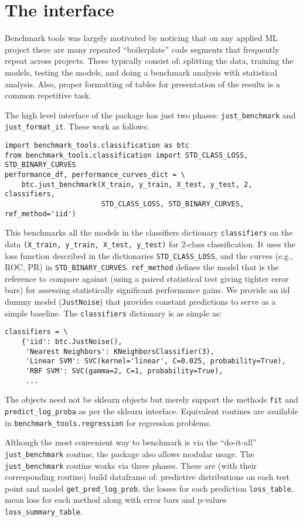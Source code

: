\documentclass{article}
\newcommand{\code}{\texttt}
\begin{document}
\section{The interface}

Benchmark tools was largely motivated by noticing that on any applied ML project there are many repeated ``boilerplate'' code segments that frequently repeat across projects.
These typically consist of: splitting the data, training the models, testing the models, and doing a benchmark analysis with statistical analysis.
Also, proper formatting of tables for presentation of the results is a common repetitive task.

The high level interface of the package has just two phases: \code{just\_benchmark} and \code{just\_format\_it}.
These work as follows:
\begin{verbatim}
import benchmark_tools.classification as btc
from benchmark_tools.classification import STD_CLASS_LOSS, STD_BINARY_CURVES
performance_df, performance_curves_dict = \
    btc.just_benchmark(X_train, y_train, X_test, y_test, 2, classifiers,
                       STD_CLASS_LOSS, STD_BINARY_CURVES, ref_method='iid')
\end{verbatim}
This benchmarks all the models in the classifiers dictionary \code{classifiers} on the data \code{(X\_train, y\_train, X\_test, y\_test)} for 2-class classification.
It uses the loss function described in the dictionaries \code{STD\_CLASS\_LOSS}, and the curves (e.g., ROC, PR) in \code{STD\_BINARY\_CURVES}.
\code{ref\_method} defines the model that is the reference to compare against (using a paired statistical test giving tighter error bars) for assessing statistically significant performance gains.
We provide an iid dummy model (\code{JustNoise}) that provides constant predictions to serve as a simple baseline.
The \code{classifiers} dictionary is as simple as:
\begin{verbatim}
classifiers = \
    {'iid': btc.JustNoise(),
     'Nearest Neighbors': KNeighborsClassifier(3),
     'Linear SVM': SVC(kernel='linear', C=0.025, probability=True),
     'RBF SVM': SVC(gamma=2, C=1, probability=True),
     ...
\end{verbatim}
The objects need not be sklearn objects but merely support the methods \code{fit} and \code{predict\_log\_proba} as per the sklearn interface.
Equivalent routines are available in \code{benchmark\_tools.regression} for regression problems.

Although the most convenient way to benchmark is via the ``do-it-all'' \code{just\_benchmark} routine, the package also allows modular usage.
The \code{just\_benchmark} routine works via three phases.
These are (with their corresponding routine) build dataframe of: predictive distributions on each test point and model \code{get\_pred\_log\_prob}, the losses for each prediction \code{loss\_table}, mean loss for each method along with error bars and p-values \code{loss\_summary\_table}.
\end{document}
